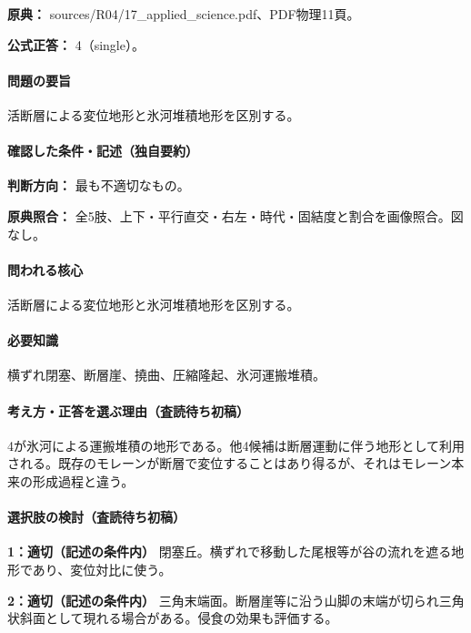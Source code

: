 \noindent\textbf{原典：} sources/R04/17\_applied\_science.pdf、PDF物理11頁。

\textbf{公式正答：} 4（single）。

\paragraph{問題の要旨} 活断層による変位地形と氷河堆積地形を区別する。

\paragraph{確認した条件・記述（独自要約）}\mbox{}\par

\noindent\textbf{判断方向：} 最も不適切なもの。\par

\noindent\textbf{原典照合：} 全5肢、上下・平行直交・右左・時代・固結度と割合を画像照合。図なし。\par

\paragraph{問われる核心} 活断層による変位地形と氷河堆積地形を区別する。

\paragraph{必要知識} 横ずれ閉塞、断層崖、撓曲、圧縮隆起、氷河運搬堆積。

\paragraph{考え方・正答を選ぶ理由（査読待ち初稿）} 4が氷河による運搬堆積の地形である。他4候補は断層運動に伴う地形として利用される。既存のモレーンが断層で変位することはあり得るが、それはモレーン本来の形成過程と違う。

\paragraph{選択肢の検討（査読待ち初稿）}\mbox{}\par

\noindent\textbf{1：適切（記述の条件内）} 閉塞丘。横ずれで移動した尾根等が谷の流れを遮る地形であり、変位対比に使う。\par

\noindent\textbf{2：適切（記述の条件内）} 三角末端面。断層崖等に沿う山脚の末端が切られ三角状斜面として現れる場合がある。侵食の効果も評価する。\par

